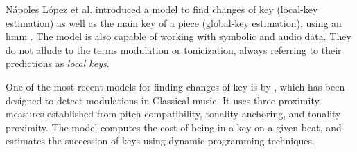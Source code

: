 N\'apoles L\'opez et al. introduced a model to find changes
of key (local-key estimation) as well as the main key of a
piece (global-key estimation), using an \gls{hmm}
\textcite{napoleslopez2019keyfinding}. The model is also
capable of working with symbolic and audio data. They do not
allude to the terms modulation or tonicization, always
referring to their predictions as \emph{local keys}.

One of the most recent models for finding changes of key is
by \textcite{feisthauer2020estimating}, which has been
designed to detect modulations in Classical music. It uses
three proximity measures established from pitch
compatibility, tonality anchoring, and tonality proximity.
The model computes the cost of being in a key on a given
beat, and estimates the succession of keys using dynamic
programming techniques.
